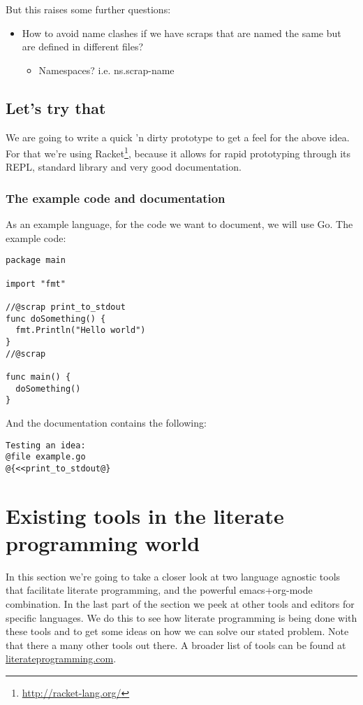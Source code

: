 \documentclass[11pt]{article}
\begin{document}
But this raises some further questions:
\begin{itemize}
\item How to avoid name clashes if we have scraps that are named the same but
are defined in different files?
\begin{itemize}
\item Namespaces? i.e. ns.scrap-name
\end{itemize}
\end{itemize}

\subsection{Let's try that}
\label{sec:orgheadline3}
We are going to write a quick 'n dirty prototype to get a feel for the
above idea. For that we're using Racket\footnote{\url{http://racket-lang.org/}}, because it allows for rapid
prototyping through its REPL, standard library and very good documentation.

\subsubsection{The example code and documentation}
\label{sec:orgheadline2}
As an example language, for the code we want to document, we will use Go.
The example code:

\begin{verbatim}
package main

import "fmt"

//@scrap print_to_stdout
func doSomething() {
  fmt.Println("Hello world")
}
//@scrap

func main() {
  doSomething()
}
\end{verbatim}

And the documentation contains the following:

\begin{verbatim}
Testing an idea:
@file example.go
@{<<print_to_stdout@}
\end{verbatim}

\section{Existing tools in the literate programming world}
\label{sec:orgheadline12}
In this section we're going to take a closer look at two language agnostic
tools that facilitate literate programming, and the powerful emacs+org-mode
combination. In the last part of the section
we peek at other tools and editors for specific languages. We do this to see
how literate programming is being done with these tools and to get some ideas
on how we can solve our stated problem. Note that there a many other tools
out there. A broader list of tools can be found at \href{http://www.literateprogramming.com/tools.html}{literateprogramming.com}.
\end{document}
